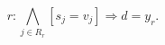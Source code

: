 \begin{equation}
r:\bigwedge_{j\in R_r}[s_j=v_j]\Longrightarrow d=y_r .
\label{eq:production_rule}
\tag{5}
\end{equation}
